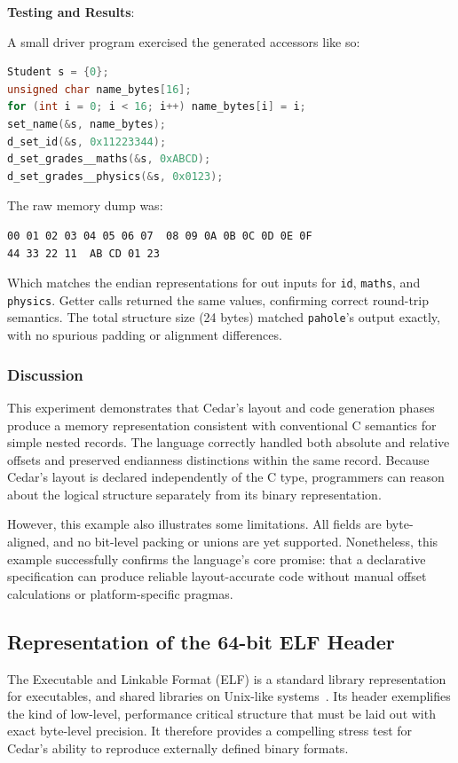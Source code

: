 \textbf{Testing and Results}:

A small driver program exercised the generated accessors like so:
\begin{lstlisting}[language=C, caption={Driver code for testing the Student layout}, label=lst:student_driver]
Student s = {0};
unsigned char name_bytes[16];
for (int i = 0; i < 16; i++) name_bytes[i] = i;
set_name(&s, name_bytes);
d_set_id(&s, 0x11223344);
d_set_grades__maths(&s, 0xABCD);
d_set_grades__physics(&s, 0x0123);
\end{lstlisting}

The raw memory dump was:
\begin{verbatim}
00 01 02 03 04 05 06 07  08 09 0A 0B 0C 0D 0E 0F  
44 33 22 11  AB CD 01 23
\end{verbatim}
Which matches the endian representations for out inputs for \texttt{id},
\texttt{maths}, and \texttt{physics}.
Getter calls returned the same values, confirming correct round-trip semantics.
The total structure size (24 bytes) matched \texttt{pahole}'s output exactly,
with no spurious padding or alignment differences.

\subsubsection{Discussion}
This experiment demonstrates that Cedar's layout and code generation phases
produce a memory representation consistent with conventional C semantics
for simple nested records. The language correctly handled both
absolute and relative offsets and preserved endianness distinctions
within the same record.
Because Cedar's layout is declared independently of the C type,
programmers can reason about the logical structure separately from its
binary representation.

However, this example also illustrates some limitations.
All fields are byte-aligned, and no bit-level packing
or unions are yet supported. Nonetheless, this example
successfully confirms the language's core promise: that a declarative
specification can produce reliable layout-accurate code
without manual offset calculations or platform-specific pragmas.

\subsection{Representation of the 64-bit ELF Header}
The Executable and Linkable Format (ELF) is a standard library representation
for executables, and shared libraries on Unix-like systems~\cite{elf_spec}.
Its header exemplifies the kind of low-level, performance critical structure
that must be laid out with exact byte-level precision.
It therefore provides a compelling stress test for Cedar's
ability to reproduce externally defined binary formats. 

